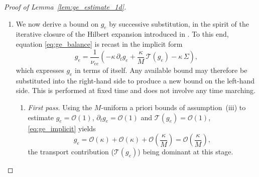 \documentclass[pdflatex,final,10pt]{article}
\begin{document}
\begin{proof}[Proof of Lemma~\ref{lem:ge_estimate_1d}]
\begin{enumerate}
Writing likewise $v(v-Mu_e) = (v-Mu_e)^2 + Mu_e(v-Mu_e)$ and using the moment identities
$\langle (v-Mu_e)^2\mathcal{M}_e\rangle = n_e T_{e,0}$ and
$\langle (v-Mu_e)^3\mathcal{M}_e\rangle = 0$, we obtain
\begin{equation} \label{eq:source_exact}
    S_e = -M\, \Sigma,
    \quad
    \Sigma := \frac{\partial_x u_e}{T_{e,0}}
              \Big( (v-Mu_e)^2 - T_{e,0} \Big)\mathcal{M}_e
            = \mathcal{O}(1) .
\end{equation}
Consequently the right-hand side of \eqref{eq:ge_balance} equals $-\kappa\,\Sigma = \mathcal{O}(\kappa)$. This estimate is instrumental in deriving the optimal bound for $g_e$.
\item We now derive a bound on $g_e$ by successive substitution, in the spirit of
the iterative closure of the Hilbert expansion introduced in
\cite{Caflisch1980}. To this end, equation \eqref{eq:ge_balance} is recast in the implicit form
\begin{equation} \label{eq:ge_implicit}
    g_e = \frac{1}{\nu_{ee}}
          \left( -\kappa\, \partial_t g_e + \frac{\kappa}{M}\,\mathcal{T}(g_e) - \kappa\, \Sigma \right),
\end{equation}
which expresses $g_e$ in terms of itself. Any available bound may therefore be substituted into the right-hand side to produce a new bound on the left-hand side. This is performed at fixed time and does not involve any time marching.

\begin{enumerate}
\item \emph{First pass.} 
Using the $M$-uniform a priori bounds of assumption~(iii)
to estimate $g_e = \mathcal{O}(1)$, $\partial_t g_e = \mathcal{O}(1)$ and
$\mathcal{T}(g_e) = \mathcal{O}(1)$, \eqref{eq:ge_implicit} yields
\begin{equation} \label{eq:first_pass}
    g_e = \mathcal{O}(\kappa) + \mathcal{O}(\kappa)
        + \mathcal{O}\!\left(\frac{\kappa}{M}\right)
        = \mathcal{O}\!\left(\frac{\kappa}{M}\right),
\end{equation}
the transport contribution ($\mathcal{T}(g_e)$) being dominant at this stage.


\end{enumerate}
\end{enumerate}
\end{proof}
\end{document}
